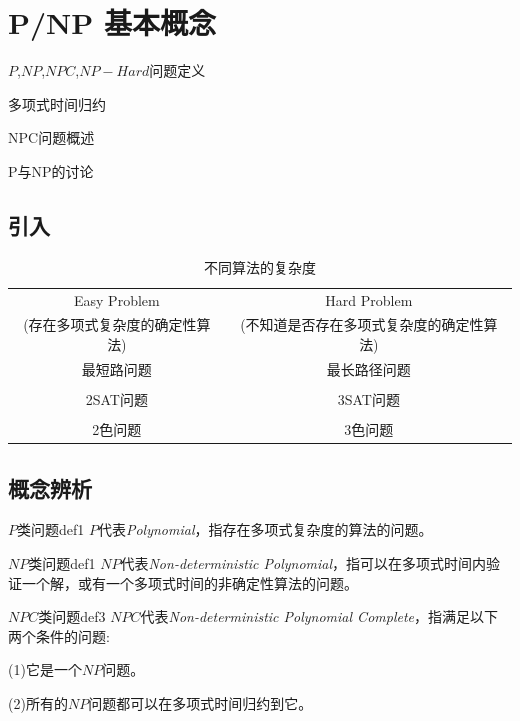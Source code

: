 	
	\chapter{P/NP 基本概念}
	
	\begin{introduction}
		\item $P$,$NP$,$NPC$,$NP-Hard$问题定义
		\item 多项式时间归约
		\item NPC问题概述
		\item P与NP的讨论
	\end{introduction}
	
	\section{引入}
	\begin{table}[!htbp]
		\centering
		\caption{不同算法的复杂度}
		\begin{tabular}{cc}
			\toprule[0.5mm]
			Easy Problem & Hard Problem\\
			(存在多项式复杂度的确定性算法)&(不知道是否存在多项式复杂度的确定性算法)\\
			\midrule[0.4mm]
			最短路问题&最长路径问题\\ \\
			2SAT问题&3SAT问题\\ \\
			2色问题&3色问题\\ 
			\bottomrule
		\end{tabular}
	\end{table}
	
	\section{概念辨析}
	\begin{definition}{$P$类问题}{def1}
	$P$代表\textit{Polynomial}，指存在多项式复杂度的算法的问题。
	\end{definition}

	\begin{definition}{$NP$类问题}{def1}
	$NP$代表\textit{Non-deterministic Polynomial}，指可以在多项式时间内验证一个解，或有一个多项式时间的非确定性算法的问题。
	\end{definition}

	\begin{definition}{$NPC$类问题}{def3}
	$NPC$代表\textit{Non-deterministic Polynomial Complete}，指满足以下两个条件的问题:
	
	(1)它是一个$NP$问题。
	
	(2)所有的$NP$问题都可以在多项式时间归约到它。
	\end{definition}

